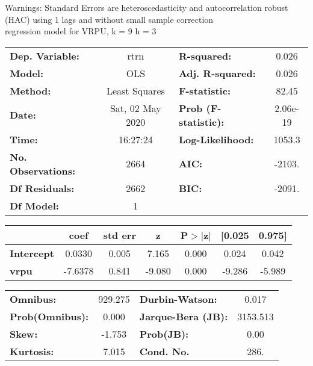 Warnings: \newline
 [1] Standard Errors are heteroscedasticity and autocorrelation robust (HAC) using 1 lags and without small sample correction\\ 

regression model for VRPU, k = 9 h = 3\begin{center}
\begin{tabular}{lclc}
\toprule
\textbf{Dep. Variable:}    &       rtrn       & \textbf{  R-squared:         } &     0.026   \\
\textbf{Model:}            &       OLS        & \textbf{  Adj. R-squared:    } &     0.026   \\
\textbf{Method:}           &  Least Squares   & \textbf{  F-statistic:       } &     82.45   \\
\textbf{Date:}             & Sat, 02 May 2020 & \textbf{  Prob (F-statistic):} &  2.06e-19   \\
\textbf{Time:}             &     16:27:24     & \textbf{  Log-Likelihood:    } &    1053.3   \\
\textbf{No. Observations:} &        2664      & \textbf{  AIC:               } &    -2103.   \\
\textbf{Df Residuals:}     &        2662      & \textbf{  BIC:               } &    -2091.   \\
\textbf{Df Model:}         &           1      & \textbf{                     } &             \\
\bottomrule
\end{tabular}
\begin{tabular}{lcccccc}
                   & \textbf{coef} & \textbf{std err} & \textbf{z} & \textbf{P$> |$z$|$} & \textbf{[0.025} & \textbf{0.975]}  \\
\midrule
\textbf{Intercept} &       0.0330  &        0.005     &     7.165  &         0.000        &        0.024    &        0.042     \\
\textbf{vrpu}      &      -7.6378  &        0.841     &    -9.080  &         0.000        &       -9.286    &       -5.989     \\
\bottomrule
\end{tabular}
\begin{tabular}{lclc}
\textbf{Omnibus:}       & 929.275 & \textbf{  Durbin-Watson:     } &    0.017  \\
\textbf{Prob(Omnibus):} &   0.000 & \textbf{  Jarque-Bera (JB):  } & 3153.513  \\
\textbf{Skew:}          &  -1.753 & \textbf{  Prob(JB):          } &     0.00  \\
\textbf{Kurtosis:}      &   7.015 & \textbf{  Cond. No.          } &     286.  \\
\bottomrule
\end{tabular}
\end{center}

